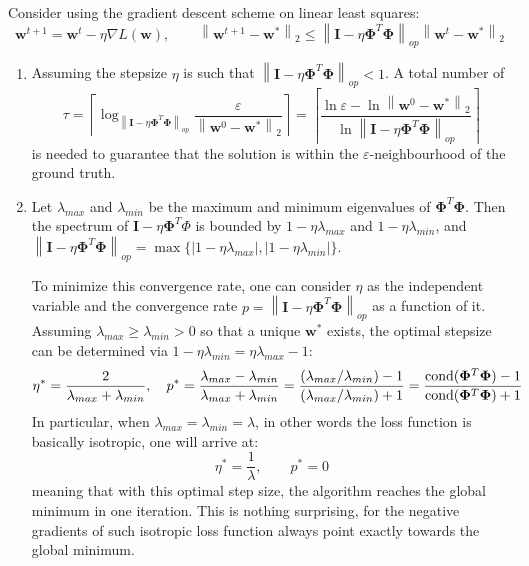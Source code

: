 \documentclass[a4paper, 10pt]{article}
\begin{document}
Consider using the gradient descent scheme on linear least squares:
\begin{equation}
    \mathbf{w}^{t+1} = \mathbf{w}^t - \eta \nabla L(\mathbf{w}),\qquad \left\| \mathbf{w}^{t+1} - \mathbf{w}^*\right\|_2 \leq \left\| \mathbf{I} - \eta \bm{\Phi}^T \bm{\Phi} \right\|_{op} \left\| \mathbf{w}^t - \mathbf{w}^* \right\|_2
\end{equation}
\begin{enumerate}[resume*]
    \item Assuming the stepsize $\eta$ is such that $\left\| \mathbf{I} - \eta \bm{\Phi}^T \bm{\Phi} \right\|_{op} < 1$. A total number of 
    \begin{equation}
        \tau = \left\lceil \log_{\left\| \mathbf{I} - \eta \bm{\Phi}^T \bm{\Phi} \right\|_{op}}\frac{\varepsilon}{\left\|\mathbf{w}^0 - \mathbf{w}^*\right\|_2} \right\rceil = \left\lceil \frac{\ln \varepsilon - \ln \left\| \mathbf{w}^0 - \mathbf{w}^* \right\|_2 }{\ln \left\| \mathbf{I} - \eta \bm{\Phi}^T \bm{\Phi} \right\|_{op}} \right\rceil
    \end{equation}
    is needed to guarantee that the solution is within the $\varepsilon$-neighbourhood of the ground truth.
    
    \item Let $\lambda_{max}$ and $\lambda_{min}$ be the maximum and minimum eigenvalues of $\bm{\Phi}^T \bm{\Phi}$. Then the spectrum of $\mathbf{I} - \eta \bm{\Phi}^T \Phi$ is bounded by $1 - \eta \lambda_{max}$ and $1 - \eta \lambda_{min}$, and $\left\| \mathbf{I} - \eta \bm{\Phi}^T \bm{\Phi} \right\|_{op} = \max\{|1 - \eta \lambda_{max}|, |1 - \eta \lambda_{min}|\}$.
    
    To minimize this convergence rate, one can consider $\eta$ as the independent variable and the convergence rate $p = \left\| \mathbf{I} - \eta \bm{\Phi}^T \bm{\Phi} \right\|_{op}$ as a function of it. Assuming $\lambda_{max} \geq \lambda_{min} > 0$ so that a unique $\mathbf{w}^*$ exists, the optimal stepsize can be determined via $1 - \eta \lambda_{min} = \eta \lambda_{max} - 1$:
    \begin{equation}
         \eta^* = \frac{2}{\lambda_{max} + \lambda_{min}},\quad p^* = \frac{\lambda_{max} - \lambda_{min}}{\lambda_{max} + \lambda_{min}} = \frac{\left(\lambda_{max}/\lambda_{min}\right) - 1}{\left(\lambda_{max}/\lambda_{min}\right) + 1} = \frac{{\rm cond}(\bm{\Phi}^T \bm{\Phi}) - 1}{{\rm cond}(\bm{\Phi}^T \bm{\Phi}) + 1}
    \end{equation}
    In particular, when $\lambda_{max} = \lambda_{min} = \lambda$, in other words the loss function is basically isotropic, one will arrive at:
    \begin{equation}
        \eta^* = \frac{1}{\lambda}, \qquad p^* = 0
    \end{equation}
    meaning that with this optimal step size, the algorithm reaches the global minimum in one iteration. This is nothing surprising, for the negative gradients of such isotropic loss function always point exactly towards the global minimum.
    

\end{enumerate}
\end{document}
